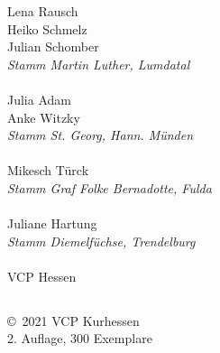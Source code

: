 \begin{centering}
\begin{multicols}{2}
Lena Rausch \\ Heiko Schmelz \\ Julian Schomber \\
\textit{Stamm Martin Luther, Lumdatal} \\ ~\\

Julia Adam \\ Anke Witzky \\
\textit{Stamm St. Georg, Hann. Münden}  \\ ~\\

Mikesch Türck \\ \textit{Stamm Graf Folke Bernadotte, Fulda} \\ ~\\

Juliane Hartung \\ \textit{Stamm Diemelfüchse, Trendelburg} \\ ~\\

VCP Hessen

\end{multicols}

\subsection*{}
\vspace{6em} \copyright~2021 VCP Kurhessen \\
2. Auflage, 300 Exemplare

\end{centering}

